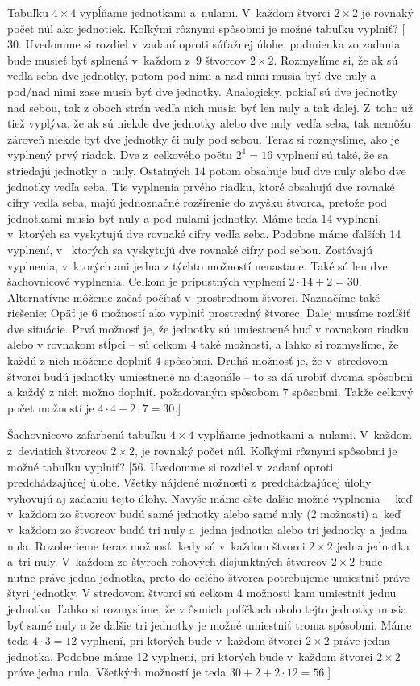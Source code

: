 {Tabuľku $4\times 4$ vypĺňame jednotkami a~nulami. V~každom štvorci $2\times 2$ je rovnaký počet núl ako jednotiek. Koľkými rôznymi spôsobmi je možné tabuľku vyplniť? [$30$. Uvedomme si rozdiel v~zadaní oproti súťažnej úlohe, podmienka zo zadania bude musieť byť splnená v~každom z~$9$ štvorcov $2\times 2$. Rozmyslíme si, že ak sú vedľa seba dve jednotky, potom pod nimi a nad nimi musia byť dve nuly a pod/nad nimi zase musia byť dve jednotky. Analogicky, pokiaľ sú dve jednotky nad sebou, tak z oboch strán vedľa nich musia byť len nuly a tak ďalej. Z~toho už tiež vyplýva, že ak sú niekde dve jednotky alebo dve nuly vedľa seba, tak nemôžu zároveň niekde byť dve jednotky či nuly pod sebou. Teraz si rozmyslíme, ako je vyplnený prvý riadok. Dve z~celkového počtu $2^4=16$ vyplnení sú také, že sa striedajú jednotky a~nuly. Ostatných $14$ potom obsahuje buď dve nuly alebo dve jednotky vedľa seba. Tie vyplnenia prvého riadku, ktoré obsahujú dve rovnaké cifry vedľa seba, majú jednoznačné rozšírenie do zvyšku štvorca, pretože pod jednotkami musia byť nuly a pod nulami jednotky. Máme teda $14$ vyplnení, v~ktorých sa vyskytujú dve rovnaké cifry vedľa seba. Podobne máme ďalších 14 vyplnení, v~ ktorých sa vyskytujú dve rovnaké cifry pod sebou. Zostávajú vyplnenia, v~ktorých ani jedna z týchto možností nenastane. Také sú len dve šachovnicové vyplnenia. Celkom je prípustných vyplnení $2\cdot 14 + 2=30$.
Alternatívne môžeme začať počítať v~prostrednom štvorci. Naznačíme také riešenie:
Opäť je $6$ možností ako vyplniť prostredný štvorec.
Ďalej musíme rozlíšiť dve situácie. Prvá možnosť je, že jednotky sú umiestnené buď v rovnakom riadku alebo v rovnakom stĺpci -- sú celkom $4 $ také možnosti, a ľahko si rozmyslíme, že každú z nich môžeme doplniť $4 $ spôsobmi.
Druhá možnosť je, že v~stredovom štvorci budú jednotky umiestnené na diagonále -- to sa dá urobiť dvoma spôsobmi a každý z nich možno doplniť.
požadovaným spôsobom $7 $ spôsobmi. Takže celkový počet možností je $4\cdot 4+2\cdot 7 = 30$.]

Šachovnicovo zafarbenú tabuľku $4\times 4$ vypĺňame jednotkami a~nulami. V~každom z~deviatich štvorcov $2\times 2$, je rovnaký počet núl. Koľkými rôznymi spôsobmi je možné tabuľku vyplniť? [$56$. Uvedomme si rozdiel v~zadaní oproti predchádzajúcej úlohe. Všetky nájdené možnosti z~predchádzajúcej úlohy vyhovujú aj zadaniu tejto úlohy. Navyše máme ešte ďalšie možné vyplnenia~-- keď v~každom zo štvorcov budú samé jednotky alebo samé nuly (2 možnosti) a~keď v~každom zo štvorcov budú tri nuly a~jedna jednotka alebo tri jednotky a~jedna nula. Rozoberieme teraz možnosť, kedy sú v~každom štvorci $2\times 2$ jedna jednotka a~tri nuly. V~každom zo štyroch rohových disjunktných štvorcov $2 \times 2$ bude nutne práve jedna jednotka, preto do celého štvorca potrebujeme umiestniť práve štyri jednotky. V stredovom štvorci sú celkom 4 možnosti kam umiestniť jednu jednotku. Ľahko si rozmyslíme, že v ôsmich políčkach okolo tejto jednotky musia byť samé nuly a že ďalšie tri jednotky je možné umiestniť troma spôsobmi. Máme teda $4\cdot 3=12$ vyplnení, pri ktorých bude v~každom štvorci $2\times 2$ práve jedna jednotka. Podobne máme 12 vyplnení, pri ktorých bude v~každom štvorci $2\times 2$ práve jedna nula. Všetkých možností je teda $30+2+2\cdot 12=56$.]

}

